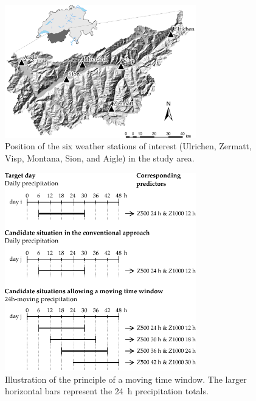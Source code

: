 \documentclass[hess, manuscript]{copernicus}
\begin{document}
	
	\begin{figure}[htb]
		\begin{center}
			\includegraphics[width=8.3cm]{figures/figure_map.pdf}
		\end{center}
		\caption{Position of the six weather stations of interest (Ulrichen, Zermatt, Visp, Montana, Sion, and Aigle) in the study area.}
		\label{fig:map}
	\end{figure}
	
	\begin{figure}[htb]
		\begin{center}
			\includegraphics[width=8.3cm]{figures/illustration_moving_window.pdf}
		\end{center}
		\caption{Illustration of the principle of a moving time window. The larger horizontal bars represent the 24~h precipitation totals.}
		\label{fig:principle}
	\end{figure}
	
\end{document}
